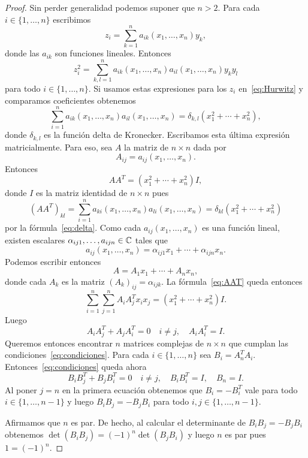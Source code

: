 \begin{proof}
	Sin perder generalidad podemos suponer que $n>2$.  Para cada
	$i\in\{1,\dots,n\}$ escribimos 
	\[
		z_i=\sum_{k=1}^n a_{ik}(x_1,\dots,x_n)y_k,
	\]
	donde las $a_{ik}$ son funciones lineales. Entonces
	\[
		z_i^2=\sum_{k,l=1}^na_{ik}(x_1,\dots,x_n)a_{il}(x_1,\dots,x_n)y_ky_l
	\]
	para todo $i\in\{1,\dots,n\}$.  Si usamos estas expresiones para los $z_i$
	en~\eqref{eq:Hurwitz} y comparamos coeficientes obtenemos
	\begin{equation}
		\label{eq:delta}
		\sum_{i=1}^n a_{ik}(x_1,\dots,x_n)a_{il}(x_1,\dots,x_n)=\delta_{k,l}(x_1^2+\cdots+x_n^2),
	\end{equation}
	donde $\delta_{k,l}$ es la función delta de Kronecker. Escribamos esta
	última expresión matricialmente. Para eso, 
	sea $A$ la matriz de $n\times n$ dada por
	\[
	A_{ij}=a_{ij}(x_1,\dots,x_n).
	\]
	Entonces 
	\begin{equation}
		\label{eq:AAT}
		AA^T=(x_1^2+\cdots+x_n^2)I,
	\end{equation}
	donde $I$ es la matriz identidad de $n\times n$ pues 
	\[
		(AA^T)_{kl}=\sum_{i=1}^na_{ki}(x_1,\dots,x_n)a_{li}(x_1,\dots,x_n)=\delta_{kl}(x_1^2+\cdots+x_n^2)
	\]
	por la fórmula~\eqref{eq:delta}. Como cada $a_{ij}(x_1,\dots,x_n)$ es una función lineal, 
	existen escalares $\alpha_{ij1},\dots,a_{ijn}\in\mathbb{C}$ tales que
	\[
		a_{ij}(x_1,\dots,x_n)=\alpha_{ij1}x_1+\cdots+\alpha_{ijn}x_n.
	\]
	Podemos escribir entonces 
	\[
		A=A_1x_1+\cdots+A_nx_n,
	\]
	donde cada $A_k$ es la matriz $(A_k)_{ij}=\alpha_{ijk}$. La fórmula~\eqref{eq:AAT} queda entonces
	\[
		\sum_{i=1}^n\sum_{j=1}^nA_iA_j^Tx_ix_j=(x_1^2+\cdots+x_n^2)I.
	\]
	Luego 
	\begin{equation}
		\label{eq:condiciones}
		A_iA_j^T+A_jA_i^T=0\quad i\ne j,\quad
		A_iA_i^T=I.
	\end{equation}
	Queremos entonces encontrar $n$ matrices complejas de $n\times n$ que
	cumplan las condiciones~\eqref{eq:condiciones}. Para cada $i\in\{1,\dots,n\}$ sea 
	$B_i=A_n^TA_i$. Entonces~\eqref{eq:condiciones} queda ahora 
	\[
		B_iB_j^T+B_jB_i^T=0\quad i\ne j,\quad
		B_iB_i^T=I,\quad
		B_n=I.
	\]
	Al poner $j=n$ en la primera ecuación obtenemos que $B_i=-B_i^T$ vale para
	todo $i\in\{1,\dots,n-1\}$ y luego $B_iB_j=-B_jB_i$ para todo
	$i,j\in\{1,\dots,n-1\}$. 

	Afirmamos que $n$ es par. De hecho, al calcular el determinante de
	$B_iB_j=-B_jB_i$ obtenemos $\det(B_iB_j)=(-1)^n\det(B_jB_i)$ y luego $n$ es
	par pues $1=(-1)^n$.


\end{proof}

